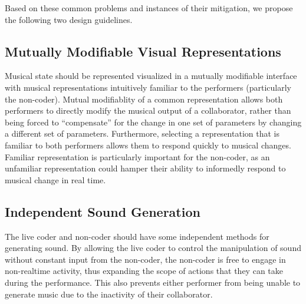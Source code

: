 \documentclass{nime-alternate}
\begin{document}
Based on these common problems and instances of their mitigation, we propose the following two design guidelines.

\subsection{Mutually Modifiable Visual Representations}
Musical state should be represented visualized in a mutually modifiable interface with musical representations intuitively familiar to the performers (particularly the non-coder). Mutual modifiablity of a common representation allows both performers to directly modify the musical output of a collaborator, rather than being forced to ``compensate'' for the change in one set of parameters by changing a different set of parameters. Furthermore, selecting a representation that is familiar to both performers allows them to respond quickly to musical changes. Familiar representation is particularly important for the non-coder, as an unfamiliar representation could hamper their ability to informedly respond to musical change in real time.

\vfill\null

\subsection{Independent Sound Generation}
The live coder and non-coder should have some independent methods for generating sound. By allowing the live coder to control the manipulation of sound without constant input from the non-coder, the non-coder is free to engage in non-realtime activity, thus expanding the scope of actions that they can take during the performance. This also prevents either performer from being unable to generate music due to the inactivity of their collaborator.  


\end{document}

